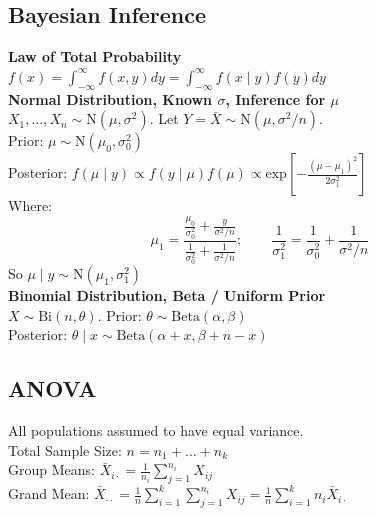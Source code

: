 \documentclass{article}
\begin{document}
\begin{multicols*}{2}
\subsection*{Bayesian Inference}
\textbf{Law of Total Probability}\\
$f(x) = \int_{-\infty}^{\infty} f(x, y) dy = \int_{-\infty}^{\infty} f(x \mid y)f(y) dy$\\
\textbf{Normal Distribution, Known $\sigma$, Inference for $\mu$}\\
$X_{1}, \dots, X_{n} \sim \mbox{N}(\mu, \sigma^{2})$. Let $Y = \bar{X} \sim \mbox{N}(\mu, \sigma^{2}/n)$.\\
Prior: $\mu \sim \mbox{N}(\mu_{0}, \sigma^{2}_{0})$\\
Posterior: $f(\mu \mid y) \propto f(y \mid \mu) f(\mu) \propto \mbox{exp}\left[ -\frac{(\mu - \mu_{1})^{2}}{2 \sigma^{2}_{1}} \right]$\\
Where:
$$\mu_{1} = \frac{\frac{\mu_{0}}{\sigma^{2}_{0}} + \frac{y}{\sigma^{2}/n}}{\frac{1}{\sigma^{2}_{0}} + \frac{1}{\sigma^{2}/n}}; \qquad \frac{1}{\sigma^{2}_{1}} = \frac{1}{\sigma^{2}_{0}} + \frac{1}{\sigma^{2} / n}$$
So $\mu \mid y \sim \mbox{N}(\mu_{1}, \sigma^{2}_{1})$\\
\textbf{Binomial Distribution, Beta / Uniform Prior}\\
$X \sim \mbox{Bi}(n, \theta)$. Prior: $\theta \sim \mbox{Beta}(\alpha, \beta)$\\
Posterior: $\theta \mid x \sim \mbox{Beta}(\alpha + x, \beta + n - x)$

\newpage
\subsection*{ANOVA}
All populations assumed to have equal variance.\\
Total Sample Size: $n = n_{1} + \dots + n_{k}$\\
Group Means: $\bar{X}_{i\cdot} = \frac{1}{n_{i}}\sum_{j=1}^{n_{i}} X_{ij}$\\
Grand Mean: $\bar{X}_{\cdot \cdot} = \frac{1}{n}\sum_{i=1}^{k} \sum_{j=1}^{n_{i}} X_{ij} = \frac{1}{n}\sum_{i=1}^{k} n_{i}\bar{X}_{i\cdot}$


\end{multicols*}
\end{document}
